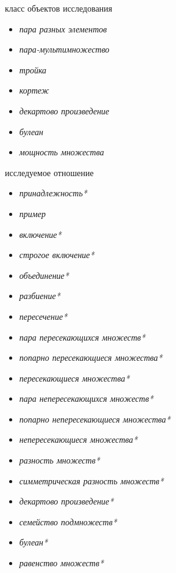 \begin{SCn}
\begin{scnsubstruct}
\begin{scnhaselementrolelist}{класс объектов исследования}
\begin{itemize}
    \item\textit{пара разных элементов}
    \item\textit{пара-мультимножество}
    \item\textit{тройка}
    \item\textit{кортеж}
    \item\textit{декартово произведение}
    \item\textit{булеан}
    \item\textit{мощность множества}
\end{itemize}
\end{scnhaselementrolelist}
\begin{scnhaselementrolelist}{исследуемое отношение}
\begin{itemize}
    \item\textit{принадлежность*}
    \item\textit{пример\scnrolesign}
    \item\textit{включение*}
    \item\textit{строгое включение*}
    \item\textit{объединение*}
    \item\textit{разбиение*}
    \item\textit{пересечение*}
    \item\textit{пара пересекающихся множеств*}
    \item\textit{попарно пересекающиеся множества*}
    \item\textit{пересекающиеся множества*}
    \item\textit{пара непересекающихся множеств*}\item\textit{попарно непересекающиеся множества*}\item\textit{непересекающиеся множества*}\item\textit{разность множеств*}\item\textit{симметрическая разность множеств*}\item\textit{декартово произведение*}\item\textit{семейство подмножеств*}\item\textit{булеан*}\item\textit{равенство множеств*}    
\end{itemize}
\end{scnhaselementrolelist}

\end{scnsubstruct}
\end{SCn}
